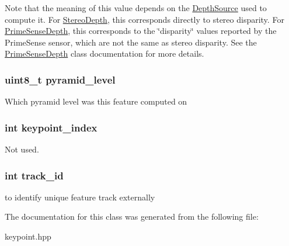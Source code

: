 Note that the meaning of this value depends on the \hyperlink{classfovis_1_1DepthSource}{DepthSource} used to compute it. For \hyperlink{classfovis_1_1StereoDepth}{StereoDepth}, this corresponds directly to stereo disparity. For \hyperlink{classfovis_1_1PrimeSenseDepth}{PrimeSenseDepth}, this corresponds to the \char`\"{}disparity\char`\"{} values reported by the PrimeSense sensor, which are not the same as stereo disparity. See the \hyperlink{classfovis_1_1PrimeSenseDepth}{PrimeSenseDepth} class documentation for more details. \hypertarget{classfovis_1_1KeypointData_a0a8d2f07bec8e75e0928d567cc0fb128}{
\subsubsection[{pyramid\_\-level}]{\setlength{\rightskip}{0pt plus 5cm}uint8\_\-t {\bf pyramid\_\-level}}}
\label{classfovis_1_1KeypointData_a0a8d2f07bec8e75e0928d567cc0fb128}
Which pyramid level was this feature computed on \hypertarget{classfovis_1_1KeypointData_ad7b7d5d0b809d0fa300e7a78c0ddfdef}{
\subsubsection[{keypoint\_\-index}]{\setlength{\rightskip}{0pt plus 5cm}int {\bf keypoint\_\-index}}}
\label{classfovis_1_1KeypointData_ad7b7d5d0b809d0fa300e7a78c0ddfdef}
Not used. \hypertarget{classfovis_1_1KeypointData_a8e64acfab4c3eba5b36eb3b6f15b9434}{
\subsubsection[{track\_\-id}]{\setlength{\rightskip}{0pt plus 5cm}int {\bf track\_\-id}}}
\label{classfovis_1_1KeypointData_a8e64acfab4c3eba5b36eb3b6f15b9434}
to identify unique feature track externally 

The documentation for this class was generated from the following file:\begin{DoxyCompactItemize}
\item 
keypoint.hpp\end{DoxyCompactItemize}
